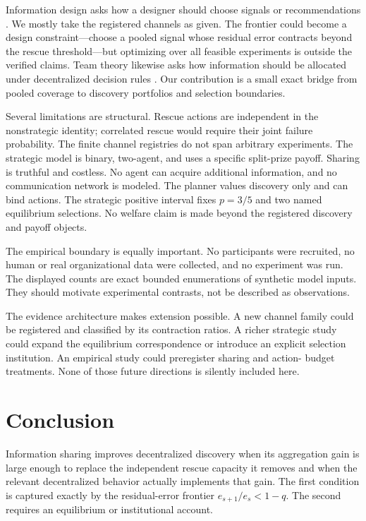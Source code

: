\documentclass[12pt]{article}
\theoremstyle{definition}
\begin{document}
Information design asks how a designer should choose signals or recommendations
\citep{KamenicaGentzkow2011,BergemannMorris2016}. We mostly take the registered
channels as given. The frontier could become a design constraint---choose a
pooled signal whose residual error contracts beyond the rescue threshold---but
optimizing over all feasible experiments is outside the verified claims. Team
theory likewise asks how information should be allocated under decentralized
decision rules \citep{Radner1962}. Our contribution is a small exact bridge from
pooled coverage to discovery portfolios and selection boundaries.

Several limitations are structural. Rescue actions are independent in the
nonstrategic identity; correlated rescue would require their joint failure
probability. The finite channel registries do not span arbitrary experiments.
The strategic model is binary, two-agent, and uses a specific split-prize payoff.
Sharing is truthful and costless. No agent can acquire additional information,
and no communication network is modeled. The planner values discovery only and
can bind actions. The strategic positive interval fixes $p=3/5$ and two named
equilibrium selections. No welfare claim is made beyond the registered discovery
and payoff objects.

The empirical boundary is equally important. No participants were recruited,
no human or real organizational data were collected, and no experiment was run.
The displayed counts are exact bounded enumerations of synthetic model inputs.
They should motivate experimental contrasts, not be described as observations.




The evidence architecture makes extension possible. A new channel family could
be registered and classified by its contraction ratios. A richer strategic
study could expand the equilibrium correspondence or introduce an explicit
selection institution. An empirical study could preregister sharing and action-
budget treatments. None of those future directions is silently included here.

\section{Conclusion}

Information sharing improves decentralized discovery when its aggregation gain
is large enough to replace the independent rescue capacity it removes and when
the relevant decentralized behavior actually implements that gain. The first
condition is captured exactly by the residual-error frontier
$e_{s+1}/e_s<1-q$. The second requires an equilibrium or institutional account.
\end{document}
